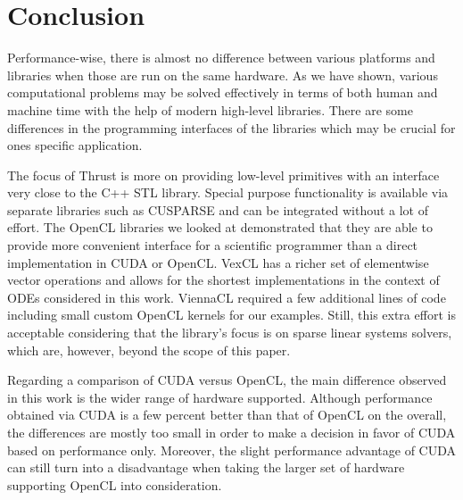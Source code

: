 \documentclass[final]{siamltex}
\begin{document}
%









%
%
\section{Conclusion}

Performance-wise, there is almost no difference between various platforms and
libraries when those are run on the same hardware. As we have shown, various
computational problems may be solved effectively in terms of both human and
machine time with the help of modern high-level libraries.  There are some
differences in the programming interfaces of the libraries which may be crucial
for ones specific application.

The focus of Thrust is more on providing low-level primitives with an interface
very close to the C++ STL library. 
Special purpose functionality is available via separate libraries such as CUSPARSE
and can be integrated without a lot of effort.
The OpenCL libraries we looked at demonstrated that they are able to
provide more convenient interface for a scientific programmer than a direct
implementation in CUDA or OpenCL.  
VexCL has a richer set of elementwise vector operations and allows for the 
shortest implementations in the context of ODEs considered in this work.
ViennaCL required a few additional lines of code including small custom OpenCL kernels for our examples.
Still, this extra effort is acceptable considering that the library's focus is on sparse linear systems solvers,
which are, however, beyond the scope of this paper.

Regarding a comparison of CUDA versus OpenCL, the main difference observed in this work is the wider range of hardware supported.
Although performance obtained via CUDA is a few percent better than that of OpenCL on the overall,
the differences are mostly too small in order to make a decision in favor of CUDA based on performance only.
Moreover, the slight performance advantage of CUDA can still turn into a disadvantage when taking the larger set of hardware supporting OpenCL into consideration.
\end{document}

